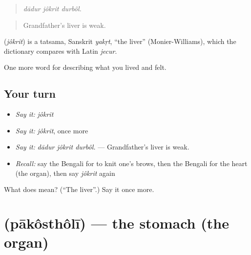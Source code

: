 \begin{quote}
  
\end{quote}

\begin{quote}
\emph{dādur jôkrit durbôl.}
\end{quote}

\begin{quote}
Grandfather's liver is weak.
\end{quote}

\begin{cousinweb}
\textbf{} (\emph{jôkrit}) is a tatsama, Sanskrit \emph{yakṛt}, \textquotedblleft{}the liver\textquotedblright{} (Monier-Williams), which the dictionary compares with Latin \emph{jecur}.
\end{cousinweb}

\begin{grammarlens}[title={What you've built}]
One more word for describing what you lived and felt.
\end{grammarlens}

\subsection*{Your turn}
\begin{itemize}
\raggedright
  \item \emph{Say it:} \emph{jôkrit}
  \item \emph{Say it:} \emph{jôkrit}, once more
  \item \emph{Say it:} \emph{dādur jôkrit durbôl.} — Grandfather's liver is weak.
  \item \emph{Recall:} say the Bengali for to knit one's brows, then the Bengali for the heart (the organ), then say \emph{jôkrit} again
\end{itemize}

\begin{tcolorbox}[breakable,colback=teal!4,colframe=teal!35!black,title={Before you move on}]
What does  mean? (\textquotedblleft{}The liver\textquotedblright{}.) Say it once more.
\end{tcolorbox}
\section[\texorpdfstring{\bn{পাকস্থলী} (pākôsthôlī)}{পাকস্থলী (pākôsthôlī)}]{ (pākôsthôlī) — the stomach (the organ)}

\label{lesson:BN-C468-pakostholi}



